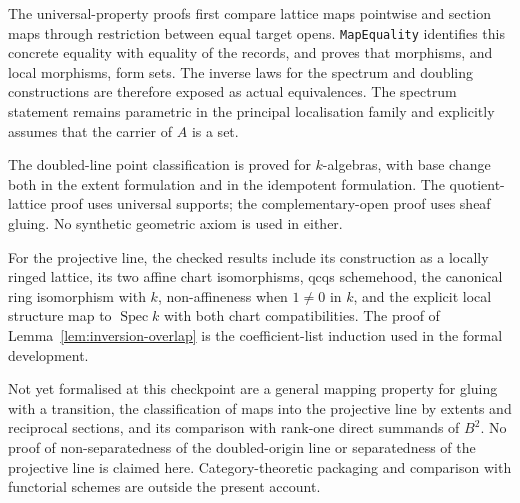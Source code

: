 \documentclass[11pt]{amsart}
\theoremstyle{definition}
\theoremstyle{remark}
\newcommand{\Spec}{\operatorname{Spec}}
\begin{document}
The universal-property proofs first compare lattice maps pointwise and
section maps through restriction between equal target opens.
\texttt{MapEquality} identifies this concrete equality with equality of
the records, and proves that morphisms, and local morphisms, form sets.
The inverse laws for the spectrum and doubling constructions are
therefore exposed as actual equivalences. The spectrum statement remains
parametric in the principal localisation family and explicitly assumes
that the carrier of $A$ is a set.

The doubled-line point classification is proved for $k$-algebras, with
base change both in the extent formulation and in the idempotent
formulation. The quotient-lattice proof uses universal supports; the
complementary-open proof uses sheaf gluing. No synthetic geometric axiom
is used in either.

For the projective line, the checked results include its construction as
a locally ringed lattice, its two affine chart isomorphisms, qcqs
schemehood, the canonical ring isomorphism with $k$, non-affineness when
$1\ne0$ in $k$, and the explicit local structure map to $\Spec k$ with
both chart compatibilities. The proof of
Lemma~\ref{lem:inversion-overlap} is the coefficient-list induction used
in the formal development.

Not yet formalised at this checkpoint are a general mapping property for
gluing with a transition, the classification of maps into the projective
line by extents and reciprocal sections, and its comparison with
rank-one direct summands of $B^2$. No proof of non-separatedness of the
doubled-origin line or separatedness of the projective line is claimed
here. Category-theoretic packaging and comparison with functorial
schemes are outside the present account.
\end{document}
